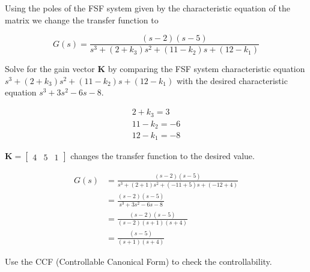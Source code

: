 \documentclass[main.tex]{subfiles}
\begin{document}
\begin{enumerate}
\begin{enumerate}
        Using the poles of the FSF system given by the characteristic equation of the matrix we change the transfer function to
        
        $$
        G(s)=\frac{(s-2)(s-5)}{s^3 + (2+k_3)s^2 + (11-k_2)s + (12-k_1)}
        $$
        
        Solve for the gain vector $\mathbf{K}$ by comparing the FSF system characteristic equation $s^3 + (2+k_3)s^2 + (11-k_2)s + (12-k_1)$ with the desired characteristic equation $s^3+3 s^2-6 s-8$. 
        
        $$
        \begin{aligned}
        2+k_3 = 3\\
        11-k_2 = -6\\
        12-k_1 = -8
        \end{aligned}
        $$
        
        $\mathbf{K} = \left[\begin{array}{lll}4 & 5 & 1\end{array}\right]$ changes the transfer function to the desired value. 


        $$
        \begin{aligned}
        G(s) &= \frac{(s-2)(s-5)}{s^3+\left(2+1\right) s^2+\left(-11+5\right) s+\left(-12+4\right)}\\
        &= \frac{(s-2)(s-5)}{s^3 + 3s^2 - 6s -8}\\
        &= \frac{(s-2)(s-5)}{(s-2)(s+1)(s+4)}\\
        &= \frac{(s-5)}{(s+1)(s+4)}
        \end{aligned}
        $$

        Use the CCF (Controllable Canonical Form) to check the controllability. 


\end{enumerate}
\end{enumerate}
\end{document}
